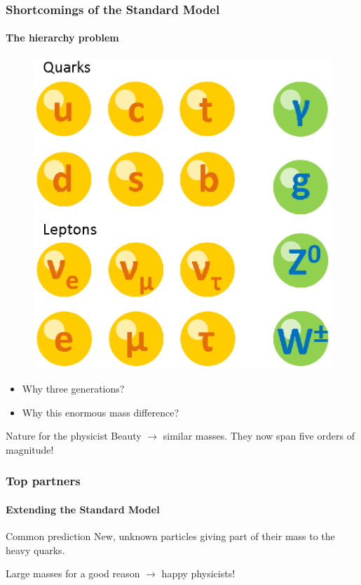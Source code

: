 \documentclass[ukenglish]{beamer}
\begin{document}
\begin{frame}
    \frametitle{Shortcomings of the Standard Model}
    \framesubtitle{The hierarchy problem}
    \begin{figure}[h!]
        \centering
        \includegraphics[width=.35\textwidth]{standard_model_particles}
    \end{figure}
    \begin{itemize}
        \item Why three generations?
        \item Why this enormous mass difference?
    \end{itemize}
    \begin{block}
        {Nature for the physicist}
        Beauty $\rightarrow$ similar masses. They now span five orders of magnitude!
    \end{block}
\end{frame}

\begin{frame}
    \frametitle{Top partners}
    \framesubtitle{Extending the Standard Model}

    \begin{block}
        {Common prediction}
        New, unknown particles giving part of their mass to the heavy
        quarks.
    \end{block}
    Large masses for a good reason $\longrightarrow$ happy physicists!
\end{frame}
\end{document}
